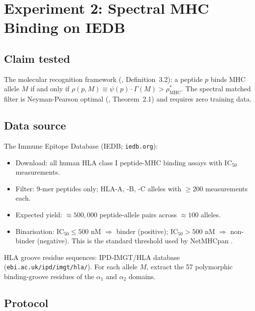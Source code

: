 \documentclass[11pt,a4paper]{article}
\theoremstyle{expthm}
\theoremstyle{definition}
\theoremstyle{remark}
\begin{document}
\section{Experiment 2: Spectral MHC Binding on IEDB}
\label{sec:exp2}

\subsection{Claim tested}

The molecular recognition framework
(\citep{sachikonye2026immuno}, Definition~3.2): a peptide $p$ binds MHC
allele $M$ if and only if
$\rho(p, M) \equiv \psi(p) \cdot \Gamma(M) > \rho^*_{\mathrm{MHC}}$.
The spectral matched filter is Neyman-Pearson optimal
(\citep{sachikonye2026immuno}, Theorem~2.1) and requires zero training
data.

\subsection{Data source}

The Immune Epitope Database (IEDB; \texttt{iedb.org}):
\begin{itemize}[leftmargin=1.4em,itemsep=2pt]
\item Download: all human HLA class I peptide-MHC binding assays with
  IC$_{50}$ measurements.
\item Filter: 9-mer peptides only; HLA-A, -B, -C alleles with $\geq 200$
  measurements each.
\item Expected yield: $\approx 500{,}000$ peptide-allele pairs across
  $\approx 100$ alleles.
\item Binarisation: IC$_{50} \leq 500$ nM $\Rightarrow$ binder (positive);
  IC$_{50} > 500$ nM $\Rightarrow$ non-binder (negative). This is the
  standard threshold used by NetMHCpan \citep{reynisson2020}.
\end{itemize}

HLA groove residue sequences: IPD-IMGT/HLA database
(\texttt{ebi.ac.uk/ipd/imgt/hla/}). For each allele $M$, extract the 57
polymorphic binding-groove residues of the $\alpha_1$ and $\alpha_2$
domains.

\subsection{Protocol}
\end{document}

